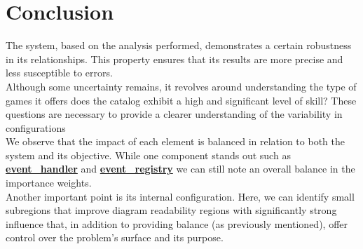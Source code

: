 \documentclass{article}
\begin{document}
  \section*{Conclusion}
  The system, based on the analysis performed, demonstrates a certain robustness in its relationships. This property ensures that its results are more precise and less susceptible to errors.\\
  Although some uncertainty remains, it revolves around understanding the type of games it offers does the catalog exhibit a high and significant level of skill? These questions are necessary 
  to provide a clearer understanding of the variability in configurations \\
  We observe that the impact of each element is balanced in relation to both the system and its objective. 
  While one component stands out such as \underline{\textbf{event\_handler}} and 
  \underline{\textbf{event\_registry}} we can still note an overall balance in the importance weights.\\
  Another important point is its internal configuration. Here, we can identify small subregions that improve diagram readability regions with significantly strong influence that,
   in addition to providing balance (as previously mentioned), offer control over the problem's surface and its purpose.
\end{document}
